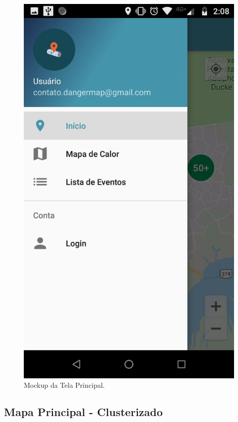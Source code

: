 \documentclass[
	12pt,				%
	openright,			%
	twoside,			%
	a4paper,			%
	english,			%
	french,				%
	spanish,			%
	brazil,				%
	]{abntex2}
\begin{document}
\begin{figure}[h]
	\caption{\label{tela_principal}Mockup da Tela Principal.}
	\begin{center}
		\includegraphics[scale=0.2]{figuras/tela-menu.jpeg}
	\end{center}
\end{figure}

\subsection{Mapa Principal - Clusterizado}
\end{document}
